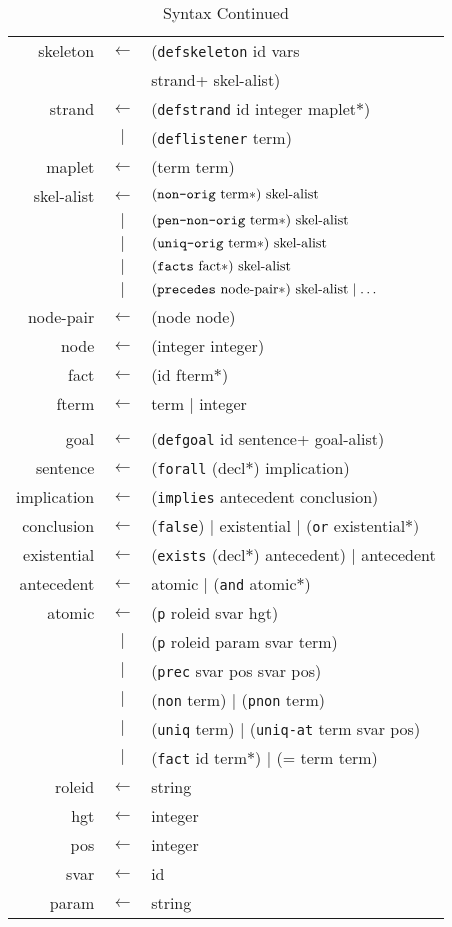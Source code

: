 \begin{table}
\newcommand{\sym}[1]{\textup{\texttt{#1}}}
\begin{center}\scshape
\begin{tabular}{rcl}
   skeleton&$\leftarrow$&
(\sym{defskeleton} id vars
\\ &&\qquad strand+ skel-alist)
\\ strand&$\leftarrow$&
(\sym{defstrand} id integer maplet$\ast$)
\\ &$\mid$&(\sym{deflistener} term)
\\ maplet&$\leftarrow$&
(term term)
\\ skel-alist&$\leftarrow$&$(\sym{non-orig}\mbox{ term}\ast)\mbox{ skel-alist}$
\\ &$\mid$&$(\sym{pen-non-orig}\mbox{ term}\ast)\mbox{ skel-alist}$
\\ &$\mid$&$(\sym{uniq-orig}\mbox{ term}\ast)\mbox{ skel-alist}$
\\ &$\mid$&$(\sym{facts}\mbox{ fact$\ast$})\mbox{ skel-alist}$
\\ &$\mid$&$(\sym{precedes}\mbox{ node-pair}\ast)\mbox{ skel-alist}\mid\ldots$
\\ node-pair&$\leftarrow$&
(node node)
\\ node&$\leftarrow$&
(integer integer)
\\ fact&$\leftarrow$&(id fterm$\ast$)
\\ fterm&$\leftarrow$&term $\mid$ integer
\\
\\ goal&$\leftarrow$&
(\sym{defgoal} id sentence+ goal-alist)
\\ sentence&$\leftarrow$&(\sym{forall} (decl$\ast$) implication)
\\ implication&$\leftarrow$&
(\sym{implies} \mbox{antecedent} \mbox{conclusion})
\\ conclusion&$\leftarrow$&(\sym{false})
   $\mid$ existential $\mid$ (\sym{or} existential$\ast)$
\\ existential&$\leftarrow$&(\sym{exists}
(decl$\ast$) antecedent) $\mid$ antecedent
\\ antecedent&$\leftarrow$& atomic $\mid$ (\sym{and} atomic$\ast$)
\\ atomic&$\leftarrow$&(\sym{p} roleid svar hgt)
\\ &$\mid$&(\sym{p} roleid param svar term)
\\ &$\mid$&(\sym{prec} svar pos svar pos)
\\ &$\mid$&(\sym{non} term) $\mid$ (\sym{pnon} term)
\\ &$\mid$&(\sym{uniq} term) $\mid$ (\sym{uniq-at} term svar pos)
\\ &$\mid$&(\sym{fact} id term$\ast$) $\mid$ (= term term)
\\ roleid&$\leftarrow$& string
\\ hgt&$\leftarrow$& integer
\\ pos&$\leftarrow$& integer
\\ svar&$\leftarrow$& id
\\ param&$\leftarrow$& string
\end{tabular}
\end{center}
\caption{{\cpsa} Syntax Continued}\label{tab:goal}
\end{table}

